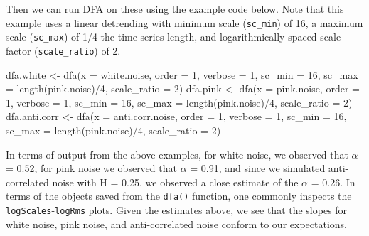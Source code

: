 \documentclass[
  english,
  man]{apa6}
\newenvironment{Shaded}{\begin{snugshade}}{\end{snugshade}}
\newcommand{\AttributeTok}[1]{\textcolor[rgb]{0.77,0.63,0.00}{#1}}
\newcommand{\DecValTok}[1]{\textcolor[rgb]{0.00,0.00,0.81}{#1}}
\newcommand{\FunctionTok}[1]{\textcolor[rgb]{0.00,0.00,0.00}{#1}}
\newcommand{\NormalTok}[1]{#1}
\newcommand{\OtherTok}[1]{\textcolor[rgb]{0.56,0.35,0.01}{#1}}
\newcommand{\SpecialCharTok}[1]{\textcolor[rgb]{0.00,0.00,0.00}{#1}}
\begin{document}
Then we can run DFA on these using the example code below. Note that
this example uses a linear detrending with minimum scale (\texttt{sc\_min}) of
16, a maximum scale (\texttt{sc\_max}) of 1/4 the time series length, and
logarithmically spaced scale factor (\texttt{scale\_ratio}) of 2.

\begin{Shaded}
\begin{Highlighting}[]
\NormalTok{dfa.white }\OtherTok{\textless{}{-}} \FunctionTok{dfa}\NormalTok{(}\AttributeTok{x =}\NormalTok{ white.noise, }\AttributeTok{order =} \DecValTok{1}\NormalTok{, }\AttributeTok{verbose =} \DecValTok{1}\NormalTok{,}
                \AttributeTok{sc\_min =} \DecValTok{16}\NormalTok{, }\AttributeTok{sc\_max =} \FunctionTok{length}\NormalTok{(pink.noise)}\SpecialCharTok{/}\DecValTok{4}\NormalTok{, }\AttributeTok{scale\_ratio =} \DecValTok{2}\NormalTok{)}
\NormalTok{dfa.pink }\OtherTok{\textless{}{-}} \FunctionTok{dfa}\NormalTok{(}\AttributeTok{x =}\NormalTok{ pink.noise, }\AttributeTok{order =} \DecValTok{1}\NormalTok{, }\AttributeTok{verbose =} \DecValTok{1}\NormalTok{,}
                \AttributeTok{sc\_min =} \DecValTok{16}\NormalTok{, }\AttributeTok{sc\_max =} \FunctionTok{length}\NormalTok{(pink.noise)}\SpecialCharTok{/}\DecValTok{4}\NormalTok{, }\AttributeTok{scale\_ratio =} \DecValTok{2}\NormalTok{)}
\NormalTok{dfa.anti.corr }\OtherTok{\textless{}{-}} \FunctionTok{dfa}\NormalTok{(}\AttributeTok{x =}\NormalTok{ anti.corr.noise, }\AttributeTok{order =} \DecValTok{1}\NormalTok{, }\AttributeTok{verbose =} \DecValTok{1}\NormalTok{,}
                \AttributeTok{sc\_min =} \DecValTok{16}\NormalTok{, }\AttributeTok{sc\_max =} \FunctionTok{length}\NormalTok{(pink.noise)}\SpecialCharTok{/}\DecValTok{4}\NormalTok{, }\AttributeTok{scale\_ratio =} \DecValTok{2}\NormalTok{)}
\end{Highlighting}
\end{Shaded}

In terms of output from the above examples, for white noise, we observed
that \(\alpha\) = 0.52, for pink noise we observed that
\(\alpha\) = 0.91, and since we simulated anti-correlated
noise with H = 0.25, we observed a close estimate of the \(\alpha\) =
0.26. In terms of the objects saved from the \texttt{dfa()}
function, one commonly inspects the \texttt{logScales}-\texttt{logRms} plots. Given
the estimates above, we see that the slopes for white noise, pink noise,
and anti-correlated noise conform to our expectations.
\end{document}
